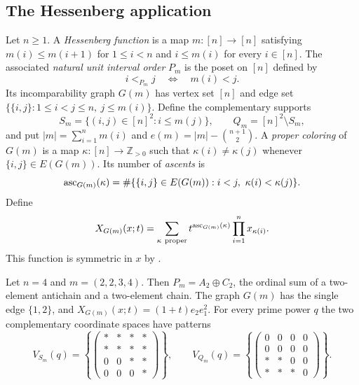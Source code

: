 \subsection{The Hessenberg application}
\begin{definition}
\label{def:hessenberg-supports}
{
Let $n\geq1$. A \emph{Hessenberg function} is a map $m:[n]\to[n]$
satisfying $m(i)\leq m(i+1)$ for $1\leq i<n$ and $i\leq m(i)$
for every $i\in[n]$. The associated \emph{natural unit interval order}
$P_m$ is the poset on $[n]$ defined by
\[
 i<_{P_m}j\quad\Longleftrightarrow\quad m(i)<j.
\]
Its incomparability graph $G(m)$ has vertex set $[n]$ and edge set
$\{\{i,j\}:1\leq i<j\leq n,\ j\leq m(i)\}$.
Define the complementary supports
\[
 S_m=\{(i,j)\in[n]^2:i\leq m(j)\},\qquad
 Q_m=[n]^2\setminus S_m,
\]
and put $|m|=\sum_{i=1}^n m(i)$ and
$e(m)=|m|-\binom{n+1}{2}$.
A \emph{proper coloring} of $G(m)$ is a map
$\kappa:[n]\to\mathbb Z_{>0}$ such that $\kappa(i)\ne\kappa(j)$
whenever $\{i,j\}\in E(G(m))$. Its number of \emph{ascents} is
\[
 \operatorname{asc}_{G(m)}(\kappa)=
 \#\{\{i,j\}\in E(G(m)):i<j,\ \kappa(i)<\kappa(j)\}.
\]
Define
\begin{equation}
 X_{G(m)}(x;t)=\sum_{\kappa\ \text{proper}}
 t^{\asc_{G(m)}(\kappa)}
 \prod_{i=1}^n x_{\kappa(i)}.
 \label{eq:chromatic-quasisymmetric-function}
\end{equation}
This function is symmetric in $x$ by
\textcite[Theorem~4.5]{Shareshian-Wachs-cqsf}.}
\end{definition}
\begin{example}
\label{ex:hessenberg-supports}
Let $n=4$ and $m=(2,2,3,4)$. Then $P_m=A_2\oplus C_2$, the
ordinal sum of a two-element antichain and a two-element chain.
The graph $G(m)$ has the single edge $\{1,2\}$, and
$X_{G(m)}(x;t)=(1+t)e_2e_1^2$. For every prime power $q$ the
two complementary coordinate spaces have patterns
{
\[
 V_{S_m}(q)=\left\{\begin{pmatrix}
 \ast&\ast&\ast&\ast\\
 \ast&\ast&\ast&\ast\\
 0&0&\ast&\ast\\
 0&0&0&\ast
 \end{pmatrix}\right\},
 \qquad
 V_{Q_m}(q)=\left\{\begin{pmatrix}
 0&0&0&0\\
 0&0&0&0\\
 \ast&\ast&0&0\\
 \ast&\ast&\ast&0
 \end{pmatrix}\right\}.
\]
}
\end{example}

